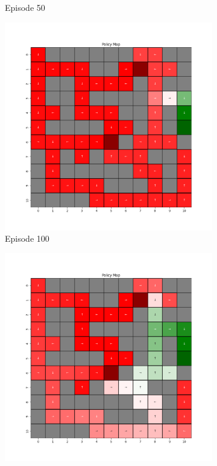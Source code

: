 \documentclass{assignment}
\begin{document}
\begin{figure}[H]
\begin{subfigure}{0.3\textwidth}
    \caption{Episode 50}
    \end{subfigure}\hfill
    \begin{subfigure}{0.3\textwidth}
        \includegraphics[width=\textwidth]{figures/policy_q/default/policy_alpha_0.1_gamma_0.95_epsilon_0.2_iteration_100.png}
    \caption{Episode 100}
    \end{subfigure}
    \begin{subfigure}{0.3\textwidth}
        \includegraphics[width=\textwidth]{figures/policy_q/default/policy_alpha_0.1_gamma_0.95_epsilon_0.2_iteration_1000.png}

\end{subfigure}
\end{figure}
\end{document}
